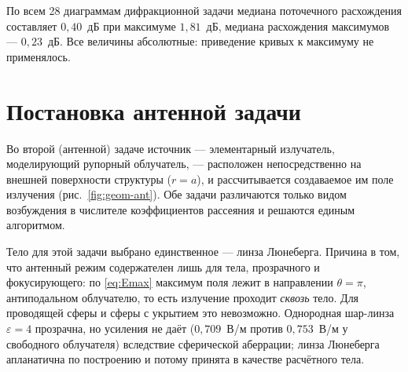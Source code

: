 \documentclass[11pt,a4paper]{article}
\begin{document}
По всем 28 диаграммам дифракционной задачи медиана поточечного расхождения
составляет $0{,}40$~дБ при максимуме $1{,}81$~дБ, медиана расхождения максимумов ---
$0{,}23$~дБ. Все величины абсолютные: приведение кривых к максимуму не
применялось.

\clearpage
\section{Постановка антенной задачи}
\label{sec:antenna}

Во второй (антенной) задаче источник --- элементарный излучатель, моделирующий
рупорный облучатель, --- расположен непосредственно на внешней поверхности
структуры ($r = a$), и рассчитывается создаваемое им поле излучения
(рис.~\ref{fig:geom-ant}). Обе задачи различаются только видом возбуждения в
числителе коэффициентов рассеяния и решаются единым алгоритмом.

Тело для этой задачи выбрано единственное --- линза Люнеберга. Причина в том, что
антенный режим содержателен лишь для тела, прозрачного и фокусирующего: по
\eqref{eq:Emax} максимум поля лежит в направлении $\theta = \pi$, антиподальном
облучателю, то есть излучение проходит \emph{сквозь} тело. Для проводящей сферы и
сферы с укрытием это невозможно. Однородная шар-линза $\varepsilon = 4$ прозрачна,
но усиления не даёт ($0{,}709$~В/м против $0{,}753$~В/м у свободного облучателя)
вследствие сферической аберрации; линза Люнеберга апланатична по построению и
потому принята в качестве расчётного тела.
\end{document}
